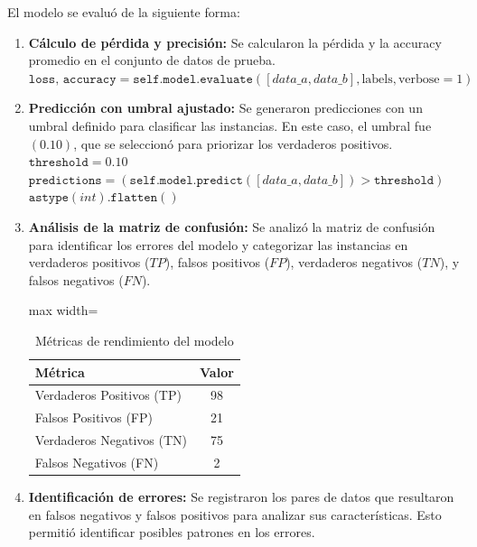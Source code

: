 El modelo se evaluó de la siguiente forma:
\begin{enumerate}
    \item \textbf{Cálculo de pérdida y precisión:} Se calcularon la pérdida y la accuracy promedio en el conjunto de datos de prueba.\\
    
   $ \texttt{loss, accuracy} = \texttt{self.model.evaluate}([data\_a, data\_b], \text{labels}, \text{verbose}=1)
$

    \item \textbf{Predicción con umbral ajustado:} Se generaron predicciones con un umbral definido para clasificar las instancias. En este caso, el umbral fue $(0.10)$, que se seleccionó para priorizar los verdaderos positivos.\\
	

$\texttt{threshold} = 0.10$ \\
$\texttt{predictions} = \left( \texttt{self.model.predict}([data\_a, data\_b]) > \texttt{threshold} \right)$ \\ $\texttt{astype}(int). \texttt{flatten}()$



	 \item \textbf{Análisis de la matriz de confusión:} Se analizó la matriz de confusión para identificar los errores del modelo y categorizar las instancias en verdaderos positivos (\(TP\)), falsos positivos (\(FP\)), verdaderos negativos (\(TN\)), y falsos negativos (\(FN\)).
	 
	 \begin{table}[ht]
\centering
\begin{adjustbox}{max width=\textwidth}
\begin{tabular}{|l|c|}
\hline
\textbf{Métrica} & \textbf{Valor} \\ \hline
Verdaderos Positivos (TP) & 98 \\ \hline
Falsos Positivos (FP) & 21 \\ \hline
Verdaderos Negativos (TN) & 75 \\ \hline
Falsos Negativos (FN) & 2 \\ \hline
\end{tabular}
\end{adjustbox}
\caption{Métricas de rendimiento del modelo}
\end{table}


    \item \textbf{Identificación de errores:} Se registraron los pares de datos que resultaron en falsos negativos y falsos positivos para analizar sus características. Esto permitió identificar posibles patrones en los errores.

\end{enumerate}


